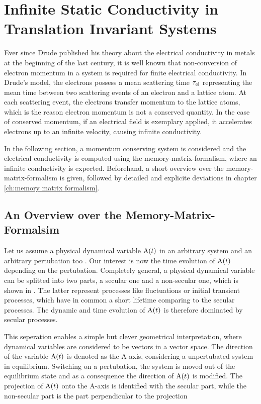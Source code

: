 %
%
%
\chapter{Infinite Static Conductivity in Translation Invariant Systems}
\label{ch:infinite conductivity}
%
%
%
Ever since Drude published his theory about the electrical conductivity in metals \cite{Drude} at the beginning of the last century, it is well known that non-conversion of electron momentum in a system is required for finite electrical conductivity.
In Drude's model, the electrons possess a mean scattering time $\tau_{\mathrm{el}}$ representing the mean time between two scattering events of an electron and a lattice atom.
At each scattering event, the electrons transfer momentum to the lattice atoms, which is the reason electron momentum is not a conserved quantity.
In the case of conserved momentum, if an electrical field is exemplary applied, it accelerates electrons up to an infinite velocity, causing infinite conductivity.

In the following section, a momentum conserving system is considered and the electrical conductivity is computed using the memory-matrix-formalism, where an infinite conductivity is expected.
Beforehand, a short overview over the memory-matrix-formalism is given, followed by detailed and explicite deviations in chapter \ref{ch:memory matrix formalism}.
%
%
\section{An Overview over the Memory-Matrix-Formalsim}
\label{sec:overview MMF}
%
%
Let us assume a physical dynamical variable $\mathrm{A}(t)$ in an arbitrary system and an arbitrary pertubation too	.
Our interest is now the time evolution of $\mathrm{A}(t)$ depending on the pertubation.
Completely general, a physical dynamical variable can be splitted into two parts, a secular one and a non-secular one, which is shown in \cite{Mori}.
The latter represent processes like fluctuations or initial transient processes, which have in common a short lifetime comparing to the secular processes.
The dynamic and time evolution of $\mathrm{A}(t)$ is therefore dominated by secular processes.

This seperation enables a simple but clever geometrical interpretation, where dynamical variables are considered to be vectors in a vector space.
The direction of the variable $\mathrm{A}(t)$ is denoted as the A-axis, considering a unpertubated system in equilibrium.
Switching on a pertubation, the system is moved out of the equilibrium state and as a consequence the direction of $\mathrm{A}(t)$ is modified.
The projection of $\mathrm{A}(t)$ onto the A-axis is identified with the secular part, while the non-secular part is the part perpendicular to the projection 

